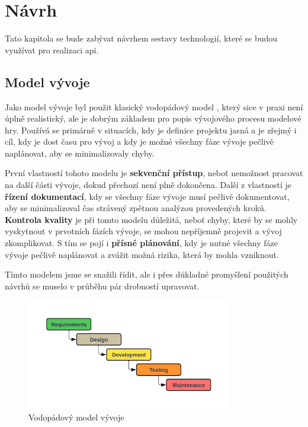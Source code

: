 \chapter{Návrh}\label{chap:design}
Tato kapitola se bude zabývat návrhem sestavy technologií, které se budou využívat pro realizaci \gls{api}.

\section{Model vývoje}\label{sec:development_model}
Jako model vývoje byl použit klasický vodopádový model , který sice v praxi není úplně realistický, ale je dobrým základem pro popis vývojového procesu modelové hry. Používá se primárně v situacích, kdy je definice projektu jasná a je zřejmý i cíl, kdy je dost času pro vývoj a kdy je možné všechny fáze vývoje pečlivě naplánovat, aby se minimalizovaly chyby.

První vlastností tohoto modelu je \textbf{sekvenční přístup}, neboť nemožnost pracovat na další části vývoje, dokud přechozí není plně dokončena. Další z vlastností je \textbf{řízení dokumentací}, kdy se všechny fáze vývoje musí pečlivě dokumentovat, aby se minimalizoval čas strávený zpětnou analýzou provedených kroků. \textbf{Kontrola kvality} je při tomto modelu důležitá, neboť chyby, které by se mohly vyskytnout v prvotních fázích vývoje, se mohou nepříjemně projevit a vývoj zkomplikovat. S tím se pojí i \textbf{přísné plánování}, kdy je nutné všechny fáze vývoje pečlivě naplánovat a zvážit možná rizika, která by mohla vzniknout.

Tímto modelem jsme se snažili řídit, ale i přes důkladné promyšlení použitých návrhů se muselo v průběhu pár drobností upravovat. 

\begin{figure}[!ht]
    \centering
    \includegraphics[width=0.8\textwidth]{figures/impl/API Implementation - waterfall model.pdf}
    \caption{Vodopádový model vývoje}\label{fig:waterfall}
\end{figure}

